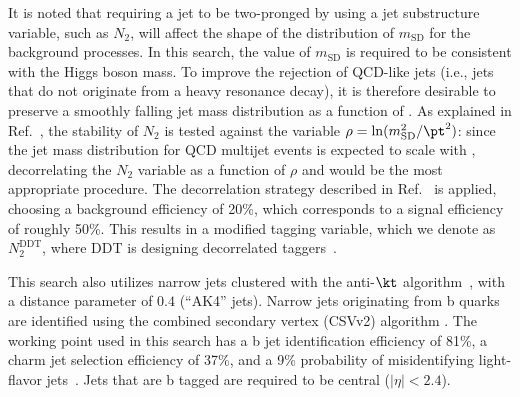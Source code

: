 It is noted that requiring a jet to be two-pronged by using a jet substructure variable,
such as $N_2$, will affect the shape of the distribution of $m_\text{SD}$ for the
background processes. In this search, the value of $m_\text{SD}$ is required to be consistent with the Higgs boson mass.
To improve the rejection of QCD-like jets (i.e., jets that
do not originate from a heavy resonance decay), it is therefore desirable to preserve a smoothly falling jet mass
distribution  as a function of \pt. As explained in
Ref.~\cite{ddt}, the stability of $N_2$ is tested against the variable
$\rho=\ln(m_{\text{SD}}^2/\pt^2)$: since the jet mass distribution for QCD multijet
events is expected to scale with \pt, decorrelating the $N_2$ variable
as a function of $\rho$ and \pt would be the most appropriate procedure. The
decorrelation strategy described in Ref.~\cite{ddt} is applied,
choosing a background efficiency of 20\%, which corresponds to a
signal efficiency of roughly 50\%. This results in a modified tagging
variable, which we denote as $N_2^\text{DDT}$, where DDT is designing decorrelated taggers~\cite{ddt}.

This search also utilizes narrow jets clustered
with the anti-$\kt$ algorithm~\cite{Cacciari:2008gp}, with a distance
parameter of $0.4$ (“AK4” jets). Narrow jets originating from b quarks are identified using the combined secondary vertex (CSVv2) algorithm \cite{Sirunyan:2017ezt}. The working point used in this search has a b jet identification efficiency of 81\%, a charm jet selection efficiency of 37\%, and a 9\% probability of misidentifying light-flavor jets~\cite{Sirunyan:2017ezt}. Jets that are b tagged are required to be central ($|\eta|<2.4$).

